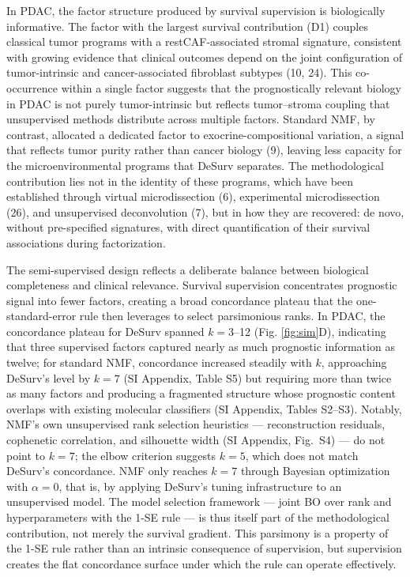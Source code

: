 \documentclass[9pt,twocolumn,twoside,]{pnas-new}
\begin{document}
In PDAC, the factor structure produced by survival supervision is
biologically informative. The factor with the largest survival
contribution (D1) couples classical tumor programs with a
restCAF-associated stromal signature, consistent with growing evidence
that clinical outcomes depend on the joint configuration of
tumor-intrinsic and cancer-associated fibroblast subtypes (10, 24). This
co-occurrence within a single factor suggests that the prognostically
relevant biology in PDAC is not purely tumor-intrinsic but reflects
tumor--stroma coupling that unsupervised methods distribute across
multiple factors. Standard NMF, by contrast, allocated a dedicated
factor to exocrine-compositional variation, a signal that reflects tumor
purity rather than cancer biology (9), leaving less capacity for the
microenvironmental programs that DeSurv separates. The methodological
contribution lies not in the identity of these programs, which have been
established through virtual microdissection (6), experimental
microdissection (26), and unsupervised deconvolution (7), but in how
they are recovered: de novo, without pre-specified signatures, with
direct quantification of their survival associations during
factorization.

The semi-supervised design reflects a deliberate balance between
biological completeness and clinical relevance. Survival supervision
concentrates prognostic signal into fewer factors, creating a broad
concordance plateau that the one-standard-error rule then leverages to
select parsimonious ranks. In PDAC, the concordance plateau for DeSurv
spanned \(k = 3\)--12 (Fig. \ref{fig:sim}D), indicating that three
supervised factors captured nearly as much prognostic information as
twelve; for standard NMF, concordance increased steadily with \(k\),
approaching DeSurv's level by \(k = 7\) (SI Appendix, Table S5) but
requiring more than twice as many factors and producing a fragmented
structure whose prognostic content overlaps with existing molecular
classifiers (SI Appendix, Tables S2--S3). Notably, NMF's own
unsupervised rank selection heuristics --- reconstruction residuals,
cophenetic correlation, and silhouette width (SI Appendix, Fig.~S4) ---
do not point to \(k = 7\); the elbow criterion suggests \(k = 5\), which
does not match DeSurv's concordance. NMF only reaches \(k = 7\) through
Bayesian optimization with \(\alpha = 0\), that is, by applying DeSurv's
tuning infrastructure to an unsupervised model. The model selection
framework --- joint BO over rank and hyperparameters with the 1-SE rule
--- is thus itself part of the methodological contribution, not merely
the survival gradient. This parsimony is a property of the 1-SE rule
rather than an intrinsic consequence of supervision, but supervision
creates the flat concordance surface under which the rule can operate
effectively.
\end{document}
